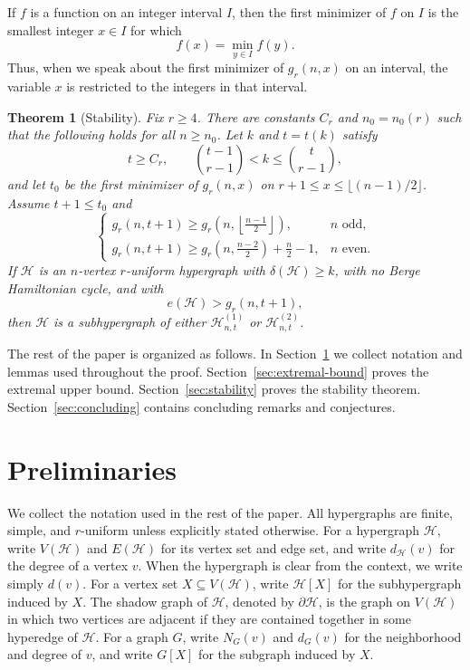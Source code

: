 \documentclass[12pt]{article}
\newtheorem{theorem}{Theorem}[section]
\newcommand{\Hcal}{\mathcal H}
\begin{document}
If $f$ is a function on an
integer interval $I$, then the first minimizer of $f$ on $I$ is the
smallest integer $x\in I$ for which
$$
f(x)=\min_{y\in I} f(y).
$$
Thus, when we speak about the first minimizer of $g_r(n,x)$ on an
interval, the variable $x$ is restricted to the integers in that interval.
\begin{theorem}[Stability]\label{thm:stability}
Fix $r\ge 4$.  There are constants $C_r$ and $n_0=n_0(r)$ such that the
following holds for all $n\ge n_0$.  Let $k$ and $t=t(k)$ satisfy
$$
        t\ge C_r,\qquad
        \binom{t-1}{r-1}< k\le \binom{t}{r-1},
$$
and let $t_0$ be the first minimizer of $g_r(n,x)$ on
$r+1\le x\le \lfloor (n-1)/2\rfloor$.  Assume $t+1\le t_0$ and
$$
\begin{cases}
g_r(n,t+1)\ge g_r\left(n,\left\lfloor\frac{n-1}{2}\right\rfloor\right),
& n\text{ odd},\\[4pt]
g_r(n,t+1)\ge g_r\left(n,\frac{n-2}{2}\right)+\frac n2-1,
& n\text{ even}.
\end{cases}
$$
If $\Hcal$ is an $n$-vertex $r$-uniform hypergraph with
$\delta(\Hcal)\ge k$, with no Berge Hamiltonian cycle, and with
$$
        e(\Hcal)>g_r(n,t+1),
$$
then $\Hcal$ is a subhypergraph of either $\Hcal^{(1)}_{n,t}$ or
$\Hcal^{(2)}_{n,t}$.
\end{theorem} 


The rest of the paper is organized as follows.  In
Section~\ref{sec:preliminaries} we collect notation and lemmas used
throughout the proof.  Section~\ref{sec:extremal-bound} proves the extremal
upper bound.  Section~\ref{sec:stability} proves the stability theorem.
Section~\ref{sec:concluding} contains concluding remarks and conjectures.

\section{Preliminaries}\label{sec:preliminaries}

We collect the notation used in the rest of the paper.  All hypergraphs
are finite, simple, and $r$-uniform unless explicitly stated otherwise.
For a hypergraph $\Hcal$, write $V(\Hcal)$ and $E(\Hcal)$ for its vertex
set and edge set, and write $d_{\Hcal}(v)$ for the degree of a vertex
$v$.  When the hypergraph is clear from the context, we write simply
$d(v)$.  For a vertex set $X\subseteq V(\Hcal)$, write $\Hcal[X]$ for the
subhypergraph induced by $X$.  The shadow graph of $\Hcal$, denoted by
$\partial\Hcal$, is the graph on $V(\Hcal)$ in which two vertices are
adjacent if they are contained together in some hyperedge of $\Hcal$.
For a graph $G$, write $N_G(v)$ and $d_G(v)$ for the neighborhood and
degree of $v$, and write $G[X]$ for the subgraph induced by $X$. 
\end{document}
